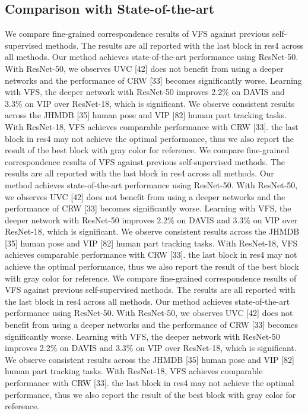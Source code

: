 \documentclass{article}
\begin{document}
\subsection{Comparison with State-of-the-art}
We compare fine-grained correspondence results of VFS against previous self-supervised methods. The results are all reported with the last block in res4 across all methods. Our method achieves state-of-the-art performance using ResNet-50. With ResNet-50, we observes UVC [42] does not benefit from using a deeper networks and the performance of CRW [33] becomes significantly worse. Learning with VFS, the deeper network with ResNet-50 improves 2.2\% on DAVIS and 3.3\% on VIP over ResNet-18, which is significant. We observe consistent results across the JHMDB [35] human pose and VIP [82] human part tracking tasks. With ResNet-18, VFS achieves comparable performance with CRW [33]. the last block in res4 may not achieve the optimal performance, thus we also report the result of the best block with gray color for reference. We compare fine-grained correspondence results of VFS against previous self-supervised methods. The results are all reported with the last block in res4 across all methods. Our method achieves state-of-the-art performance using ResNet-50. With ResNet-50, we observes UVC [42] does not benefit from using a deeper networks and the performance of CRW [33] becomes significantly worse. Learning with VFS, the deeper network with ResNet-50 improves 2.2\% on DAVIS and 3.3\% on VIP over ResNet-18, which is significant. We observe consistent results across the JHMDB [35] human pose and VIP [82] human part tracking tasks. With ResNet-18, VFS achieves comparable performance with CRW [33]. the last block in res4 may not achieve the optimal performance, thus we also report the result of the best block with gray color for reference. We compare fine-grained correspondence results of VFS against previous self-supervised methods. The results are all reported with the last block in res4 across all methods. Our method achieves state-of-the-art performance using ResNet-50. With ResNet-50, we observes UVC [42] does not benefit from using a deeper networks and the performance of CRW [33] becomes significantly worse. Learning with VFS, the deeper network with ResNet-50 improves 2.2\% on DAVIS and 3.3\% on VIP over ResNet-18, which is significant. We observe consistent results across the JHMDB [35] human pose and VIP [82] human part tracking tasks. With ResNet-18, VFS achieves comparable performance with CRW [33]. the last block in res4 may not achieve the optimal performance, thus we also report the result of the best block with gray color for reference.
\end{document}

